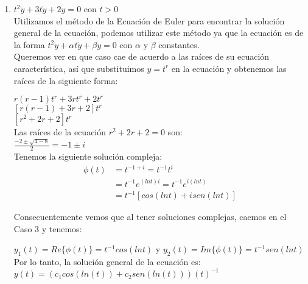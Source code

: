 \documentclass{article}
\begin{document}
\begin{enumerate}
{            
            
        }
        \item {
            $t^2 \ddot y+ 3t \dot y + 2y =0$ con $t > 0$ \\

            \color{azul}
             Utilizamos el método de la Ecuación de Euler para encontrar la solución general de la ecuación, podemos utilizar este método ya que la ecuación es de la forma $t^2\ddot{y} + \alpha t \dot{y} + \beta y = 0$ con $\alpha$ y $\beta$ constantes.\\
            
            Queremos ver en que caso cae de acuerdo a las raíces de su ecuación característica, así que substituimos $y = t^r$ en la ecuación y obtenemos las raíces de la siguiente forma:
            
            $r(r -1)t^r + 3rt^r + 2t^r$\\
            $[r(r-1) + 3r + 2] t^r$\\
            $[r^2 + 2r + 2] t^r$\\
            Las raíces de la ecuación $r^2 + 2r + 2 = 0$ son:\\
            $\frac{-2 \pm \sqrt{4 - 8}}{2} = -1\pm i$\\
            
           Tenemos la siguiente solución compleja:\\
            
            \begin{align*}
             \phi(t) &= t^{-1 + i} = t^{-1}t^{i}\\
             &= t^{-1}e^{(lnt)i} = t^{-1}e^{i(lnt)}\\
             &= t^{-1}[cos(lnt) + isen(lnt)]
            \end{align*}
        
        	Consecuentemente vemos que al tener soluciones complejas, caemos en el Caso 3 y tenemos:
        	
            $y_1(t) = Re\{\phi(t)\} = t^{-1}cos(lnt) $ y 
            $y_2(t) = Im\{\phi(t)\} = t^{-1}sen(lnt) $\\
            
          
           Por lo tanto, la solución general de la ecuación es:\\
            
            $y(t) = (c_1cos(ln(t)) + c_2 sen(ln(t)))(t)^{-1} $ \\
            
}
\end{enumerate}
\end{document}
